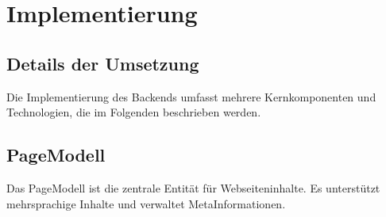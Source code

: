 \documentclass[a4paper,12pt,ngerman]{sphinxmanual}
\begin{document}
\begin{sphinxVerbatim}[commandchars=\\\{\}]
   
    
   

\PYG{p}{[} \PYG{p}{]} 
\PYG{p}{[} \PYG{p}{]} 
\PYG{p}{[} \PYG{p}{]} 
  
\end{sphinxVerbatim}

\sphinxstepscope


\section{Implementierung}
\label{\detokenize{sections/implementierung:implementierung}}\label{\detokenize{sections/implementierung::doc}}

\subsection{Details der Umsetzung}
\label{\detokenize{sections/implementierung:details-der-umsetzung}}
\sphinxAtStartPar
Die Implementierung des Backends umfasst mehrere Kernkomponenten und Technologien, die im Folgenden beschrieben werden.


\subsection{Page\sphinxhyphen{}Modell}
\label{\detokenize{sections/implementierung:page-modell}}
\sphinxAtStartPar
Das Page\sphinxhyphen{}Modell ist die zentrale Entität für Webseiteninhalte. Es unterstützt mehrsprachige Inhalte und verwaltet Meta\sphinxhyphen{}Informationen.
\end{document}
